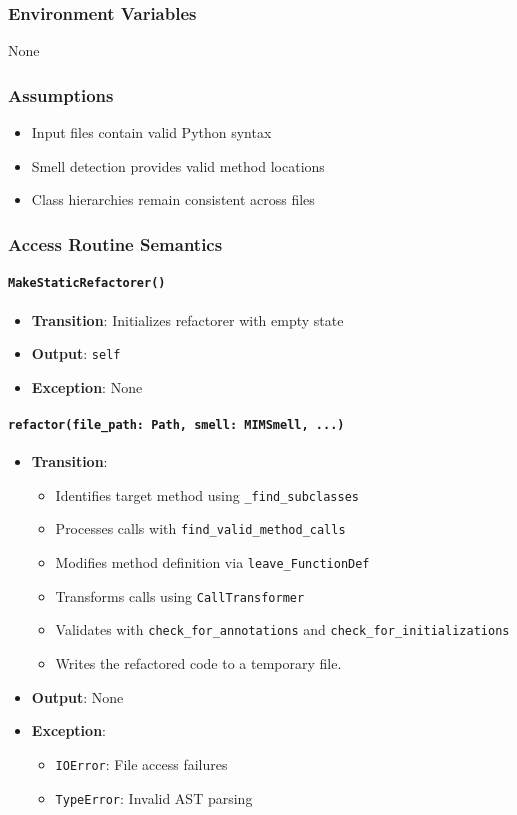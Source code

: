 \documentclass[12pt, titlepage]{article}
\begin{document}
\subsubsection{Environment Variables}
None

\subsubsection{Assumptions}
\begin{itemize}
\item Input files contain valid Python syntax
\item Smell detection provides valid method locations
\item Class hierarchies remain consistent across files
\end{itemize}

\subsubsection{Access Routine Semantics}

\paragraph{\texttt{MakeStaticRefactorer()}}
\begin{itemize}
\item \textbf{Transition}: Initializes refactorer with empty state
\item \textbf{Output}: \texttt{self}
\item \textbf{Exception}: None
\end{itemize}

\paragraph{\texttt{refactor(file\_path: Path, smell: MIMSmell, ...)}}
\begin{itemize}
\item \textbf{Transition}:
\begin{itemize}
\item Identifies target method using \texttt{\_find\_subclasses}
\item Processes calls with \texttt{find\_valid\_method\_calls}
\item Modifies method definition via \texttt{leave\_FunctionDef}
\item Transforms calls using \texttt{CallTransformer}
\item Validates with \texttt{check\_for\_annotations} and \texttt{check\_for\_initializations}
\item Writes the refactored code to a temporary file.
\end{itemize}
\item \textbf{Output}: None
\item \textbf{Exception}:
\begin{itemize}
\item \texttt{IOError}: File access failures
\item \texttt{TypeError}: Invalid AST parsing
\end{itemize}
\end{itemize}
\end{document}
